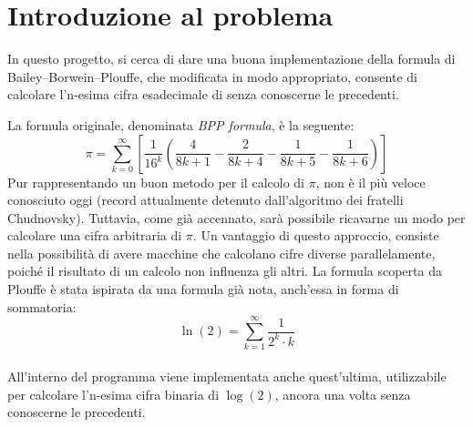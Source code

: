 \section{Introduzione al problema}
In questo progetto, si cerca di dare una buona implementazione della formula di Bailey–Borwein–Plouffe, che modificata in modo appropriato, consente di calcolare l'n-esima cifra esadecimale di \p senza conoscerne le precedenti.

\noindent La formula originale, denominata \textit{BPP formula}, è la seguente:
\begin{equation*}
\pi = \sum\limits_{k=0}^{\infty} \left[ \frac{1}{16^k}\left( \frac{4}{8k+1} - \frac{2}{8k+4} - \frac{1}{8k+5} - \frac{1}{8k+6} \right) \right]
\end{equation*}
Pur rappresentando un buon metodo per il calcolo di $\pi$, non è il più veloce conosciuto oggi (record attualmente detenuto dall'algoritmo dei fratelli Chudnovsky). Tuttavia, come già accennato, sarà possibile ricavarne un modo per calcolare una cifra arbitraria di $\pi$.
Un vantaggio di questo approccio, consiste nella possibilità di avere macchine che calcolano cifre diverse parallelamente, poiché il risultato di un calcolo non influenza gli altri.
\bigbreak \noindent
La formula scoperta da Plouffe è stata ispirata da una formula già nota, anch'essa in forma di sommatoria:
$$ \ln(2)= \sum\limits_{k=1}^{\infty} \frac{1}{2^k \cdot k} $$
\\
All'interno del programma viene implementata anche quest'ultima, utilizzabile per calcolare l'n-esima cifra binaria di $\log(2)$, ancora una volta senza conoscerne le precedenti.